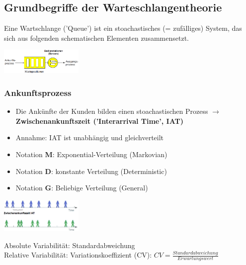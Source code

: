 \documentclass{report}
\newenvironment{Figure}
	{\par\medskip\noindent\minipage{\linewidth}}
	{\endminipage\par\medskip}
\theoremstyle{definition}
\theoremstyle{example}
\begin{document}
   \subsection{Grundbegriffe der Warteschlangentheorie}
Eine Wartschlange ('Queue') ist ein stoachastisches (= zufälliges) System, das sich aus folgenden schematischen Elementen zusammensetzt.
\begin{Figure}
\centering
\includegraphics[width=150px]{img/Warteschlangentheorie.png}
	\label{fig:Abbildung der Warteschlangentheorie}
\end{Figure}

      \subsubsection{Ankunftsprozess}
\begin{itemize}
   \item Die Ankünfte der Kunden bilden einen stoachastischen Prozess $\rightarrow$ \textbf{Zwischenankunftszeit ('Interarrival Time', IAT)}
   \item Annahme: IAT ist unabhängig und gleichverteilt
   \item Notation \textbf{M}: Exponential-Verteilung (Markovian)
   \item Notation \textbf{D}: konstante Verteilung (Deterministic)
   \item Notation \textbf{G}: Beliebige Verteilung (General)
\end{itemize}

\begin{Figure}
\centering
\includegraphics[width=150px]{img/IAT.png}
	\label{fig:Abbildung der Zwischenankunftszeit}
\end{Figure}
Absolute Variabilität: Standardabweichung\\
Relative Variabilität: Variationskoeffizient (CV): $CV = \frac{Standardabweichung}{Erwartungswert}$
\end{document}
